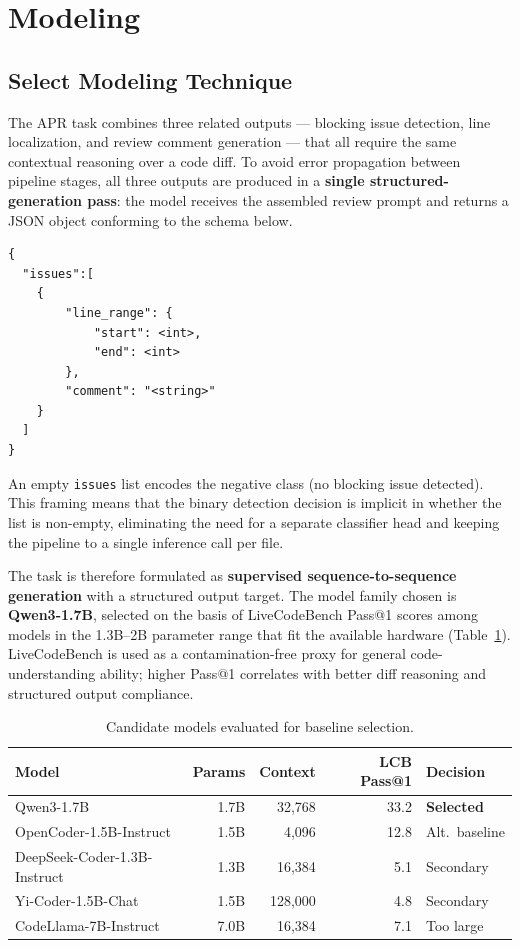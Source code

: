 \documentclass[11pt]{article}
\begin{document}
\section*{Modeling}

\subsection*{Select Modeling Technique}

The APR task combines three related outputs — blocking issue detection, line localization, and review comment generation — that all require the same contextual reasoning over a code diff. To avoid error propagation between pipeline stages, all three outputs are produced in a \textbf{single structured-generation pass}: the model receives the assembled review prompt and returns a JSON object conforming to the schema below.

\begin{verbatim}
{
  "issues":[
    {
        "line_range": {
            "start": <int>,
            "end": <int>
        },
        "comment": "<string>"
    }
  ]
}
\end{verbatim}

An empty \texttt{issues} list encodes the negative class (no blocking issue detected). This framing means that the binary detection decision is implicit in whether the list is non-empty, eliminating the need for a separate classifier head and keeping the pipeline to a single inference call per file.

The task is therefore formulated as \textbf{supervised sequence-to-sequence generation} with a structured output target. The model family chosen is \textbf{Qwen3-1.7B}, selected on the basis of LiveCodeBench Pass@1 scores among models in the 1.3B--2B parameter range that fit the available hardware (Table~\ref{tab:model_selection}). LiveCodeBench is used as a contamination-free proxy for general code-understanding ability; higher Pass@1 correlates with better diff reasoning and structured output compliance.

\begin{table}[H]
\centering
\caption{Candidate models evaluated for baseline selection.}
\label{tab:model_selection}
\begin{tabular}{@{}lrrrl@{}}
\toprule
\textbf{Model} & \textbf{Params} & \textbf{Context} & \textbf{LCB Pass@1} & \textbf{Decision} \\ \midrule
Qwen3-1.7B & 1.7B & 32,768 & 33.2 & \textbf{Selected} \\ \midrule
OpenCoder-1.5B-Instruct & 1.5B & 4,096 & 12.8 & Alt.\ baseline \\ \midrule
DeepSeek-Coder-1.3B-Instruct & 1.3B & 16,384 & 5.1 & Secondary \\ \midrule
Yi-Coder-1.5B-Chat & 1.5B & 128,000 & 4.8 & Secondary \\ \midrule
CodeLlama-7B-Instruct & 7.0B & 16,384 & 7.1 & Too large \\ \bottomrule
\end{tabular}
\end{table}
\end{document}
